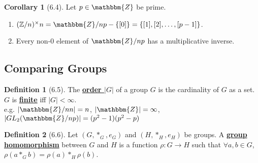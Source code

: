 \documentclass{article}
\newcommand{\Z}{\mathbbm{Z}}
\newcommand{\define}[1]{\textbf{\underline{#1}}}
\newcommand{\func}[3]{#1: #2 \to #3}
\theoremstyle{definition}
\newtheorem*{defn}{Definition}
\newtheorem*{cor}{Corollary}
\theoremstyle{remark}
\newcommand{\Znx}{(\mathbb{Z}/n)^\times}
\begin{document}
{{        
        \begin{cor}[6.4]
            Let $p \in \Z$ be prime.
            \begin{enumerate}
                \item $\Znx{n}=\Z/n{p}-\{[0]\}=\{[1],[2],\ldots,[p-1]\}$.
                \item Every non-0 element of $\Z/n{p}$ has a multiplicative inverse.
            \end{enumerate}
        \end{cor}
        }
    
        \subsection*{Comparing Groups}{
        \begin{defn}[6.5]
            The \define{order $|G|$} of a group $G$ is the cardinality of $G$ as a set. $G$ is \define{finite} iff $|G| <\infty$.\\
            e.g. $|\Z/n{n}|=n$, $|\Z|=\infty$, $|GL_2(\Z/n{p})|=(p^2-1)(p^2-p)$
        \end{defn}
        
        \begin{defn}[6.6]
            Let $(G, *_G, e_G)$ and $(H, *_H, e_H)$ be groups. A \define{group homomorphism} between $G$ and $H$ is a function $\func{\rho}{G}{H}$ such that $\forall a,b \in G$, $\rho(a*_Gb)=\rho(a)*_H\rho(b)$.
        \end{defn}
        }
    }
    
\end{document}
